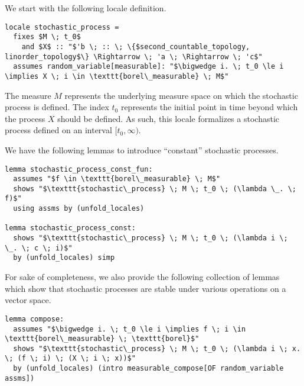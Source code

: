 We start with the following locale definition.

\begin{isadefinition}
{\small
\begin{lstlisting}[style=isabelle]
locale stochastic_process =
  fixes $M \; t_0$ 
    and $X$ :: "$'b \; :: \; \{$second_countable_topology, linorder_topology$\} \Rightarrow \; 'a \; \Rightarrow \; 'c$"
  assumes random_variable[measurable]: "$\bigwedge i. \; t_0 \le i \implies X \; i \in \texttt{borel\_measurable} \; M$"
\end{lstlisting}
}
\end{isadefinition}

The measure $M$ represents the underlying measure space on which the stochastic process is defined. The index $t_0$ represents the initial point in time beyond which the process $X$ should be defined. As such, this locale formalizes a stochastic process defined on an interval $[t_0, \infty)$. 

We have the following lemmas to introduce ``constant'' stochastic processes.

\begin{isalemma}
{\small
\begin{lstlisting}[style=isabelle]
lemma stochastic_process_const_fun:
  assumes "$f \in \texttt{borel\_measurable} \; M$"
  shows "$\texttt{stochastic\_process} \; M \; t_0 \; (\lambda \_. \; f)$"
  using assms by (unfold_locales)

lemma stochastic_process_const:
  shows "$\texttt{stochastic\_process} \; M \; t_0 \; (\lambda i \; \_. \; c \; i)$" 
  by (unfold_locales) simp

\end{lstlisting}
}
\end{isalemma}

For sake of completeness, we also provide the following collection of lemmas which show that stochastic processes are stable under various operations on a vector space.

\begin{isalemma}
{\small
\begin{lstlisting}[style=isabelle]
lemma compose:
  assumes "$\bigwedge i. \; t_0 \le i \implies f \; i \in \texttt{borel\_measurable} \; \texttt{borel}$"
  shows "$\texttt{stochastic\_process} \; M \; t_0 \; (\lambda i \; x. \; (f \; i) \; (X \; i \; x))$"
  by (unfold_locales) (intro measurable_compose[OF random_variable assms])
  \end{lstlisting}
}
\end{isalemma}


